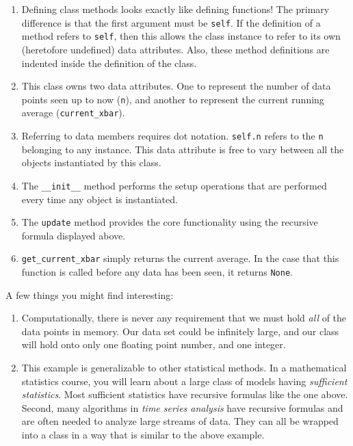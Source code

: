\documentclass[
  12pt,
  krantz2]{krantz}
\begin{document}
\begin{enumerate}
\def\labelenumi{\arabic{enumi}.}
\item
  Defining class methods looks exactly like defining functions! The primary difference is that the first argument must be \texttt{self}. If the definition of a method refers to \texttt{self}, then this allows the class instance to refer to its own (heretofore undefined) data attributes. Also, these method definitions are indented inside the definition of the class.
\item
  This class owns two data attributes. One to represent the number of data points seen up to now (\texttt{n}), and another to represent the current running average (\texttt{current\_xbar}).
\item
  Referring to data members requires dot notation. \texttt{self.n} refers to the \texttt{n} belonging to any instance. This data attribute is free to vary between all the objects instantiated by this class.
\item
  The \texttt{\_\_init\_\_} method performs the setup operations that are performed every time any object is instantiated.
\item
  The \texttt{update} method provides the core functionality using the recursive formula displayed above.
\item
  \texttt{get\_current\_xbar} simply returns the current average. In the case that this function is called before any data has been seen, it returns \texttt{None}.
\end{enumerate}

A few things you might find interesting:

\begin{enumerate}
\def\labelenumi{\roman{enumi}.}
\item
  Computationally, there is never any requirement that we must hold \emph{all} of the data points in memory. Our data set could be infinitely large, and our class will hold onto only one floating point number, and one integer.
\item
  This example is generalizable to other statistical methods. In a mathematical statistics course, you will learn about a large class of models having \emph{sufficient statistics}. Most sufficient statistics have recursive formulas like the one above. Second, many algorithms in \emph{time series analysis} have recursive formulas and are often needed to analyze large streams of data. They can all be wrapped into a class in a way that is similar to the above example.
\end{enumerate}
\end{document}
